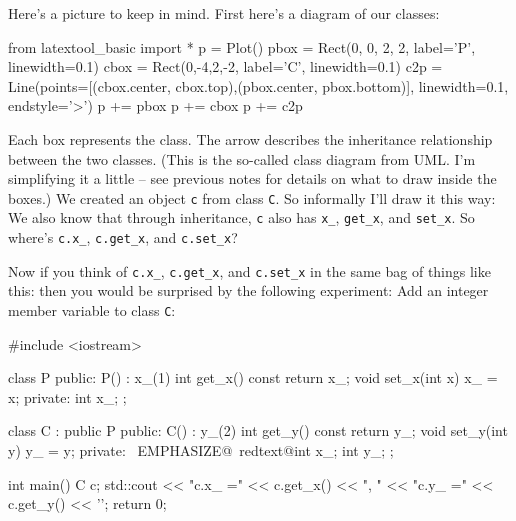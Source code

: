 Here's a picture to keep in mind. First here's a diagram of our classes:
\begin{python}
from latextool_basic import *
p = Plot()
pbox = Rect(0, 0, 2, 2, label='P', linewidth=0.1)
cbox = Rect(0,-4,2,-2, label='C', linewidth=0.1)
c2p = Line(points=[(cbox.center, cbox.top),(pbox.center, pbox.bottom)], linewidth=0.1, endstyle='>')
p += pbox
p += cbox
p += c2p
\end{python}
Each box represents the class. The arrow describes the inheritance
relationship between the two classes. (This is the so-called class
diagram from UML. I'm simplifying it a little -- see previous notes for
details on what to draw inside the boxes.) We created an object \verb!c!
from class \verb!C!. So informally I'll draw it this way:
We also know that through inheritance, \verb!c! also has \verb!x_!,
\verb!get_x!, and \verb!set_x!. So where's \verb!c.x_!,
\verb!c.get_x!, and \verb!c.set_x!?

Now if you think of \verb!c.x_!, \verb!c.get_x!, and \verb!c.set_x!
in the same bag of things like this:
then you would be surprised by the following experiment: Add an integer
member variable to class \verb!C!:

\begin{console}[commandchars=\~\@\$]
#include <iostream>

class P
{
public:
        P() : x_(1) {}
        int get_x() const { return x_; }
        void set_x(int x) { x_ = x; }
private:
        int x_;
};

class C : public P
{
public:
        C() : y_(2) {}
        int get_y() const { return y_; }
        void set_y(int y) { y_ = y; }
private:
        ~EMPHASIZE@~redtext@int x_;$$
        int y_;
};

int main()
{   
    C c;
    std::cout << "c.x_ =" << c.get_x() << ", "
              << "c.y_ =" << c.get_y() << '\n';
    return 0;
}
\end{console}

